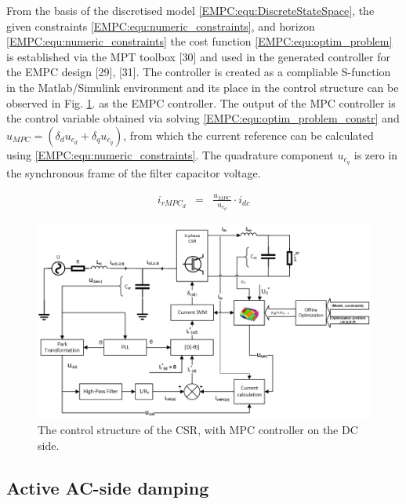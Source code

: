     From the basis of the discretised model \ref{EMPC:equ:DiscreteStateSpace}, the given constraints \ref{EMPC:equ:numeric_constraints}, and horizon \ref{EMPC:equ:numeric_constraints} the cost function \ref{EMPC:equ:optim_problem} is established via the MPT toolbox [30] and used in the generated controller for the EMPC design [29], [31]. The controller is created as a compliable S-function in the Matlab/Simulink environment and its place in the control structure can be observed in Fig. \ref{EMPC:fig:MPCStructure}. as the EMPC controller.
    The output of the MPC controller is the control variable obtained via solving \ref{EMPC:equ:optim_problem_constr} and
    $u_{MPC}=(\delta_du_{c_d}+\delta_qu_{c_q})$, from which the current reference can be calculated using \ref{EMPC:equ:numeric_constraints}. The quadrature component $u_{c_q}$ is zero in the synchronous frame of the filter capacitor voltage.


    \begin{equation}
        \begin{array}{rcl}
            i_{rMPC_{d}}&=&\frac{u_{MPC}}{u_{c_d}}\cdot i_{dc}
        \end{array}
        \label{EMPC:equ:direct_controlval}
    \end{equation}

    \begin{figure}[!ht]
        \centering
        \includegraphics[width=\textwidth]{EMPC_PNG_Pics/MPCStructure.png}
        \caption{The control structure of the CSR, with MPC controller on the DC side.}
        \label{EMPC:fig:MPCStructure}
    \end{figure}

\subsection{Active AC-side damping}\label{EMPC:sec:ACdamping}

